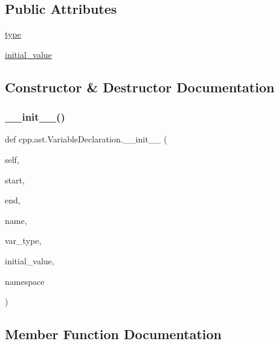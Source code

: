 \subsection*{Public Attributes}
\begin{DoxyCompactItemize}
\item 
\mbox{\hyperlink{classcpp_1_1ast_1_1VariableDeclaration_a8c7cc8578ea12f93c6e1c5c6ef4ddf99}{type}}
\item 
\mbox{\hyperlink{classcpp_1_1ast_1_1VariableDeclaration_a7c259ca42a06e264679e8ab66e7ea374}{initial\+\_\+value}}
\end{DoxyCompactItemize}


\subsection{Constructor \& Destructor Documentation}
\mbox{\label{classcpp_1_1ast_1_1VariableDeclaration_adc19909b6a3b2c2978b02044634fc13f}} 
\subsubsection{\texorpdfstring{\_\_init\_\_()}{\_\_init\_\_()}}
{\footnotesize\ttfamily def cpp.\+ast.\+Variable\+Declaration.\+\_\+\+\_\+init\+\_\+\+\_\+ (\begin{DoxyParamCaption}\item[{}]{self,  }\item[{}]{start,  }\item[{}]{end,  }\item[{}]{name,  }\item[{}]{var\+\_\+type,  }\item[{}]{initial\+\_\+value,  }\item[{}]{namespace }\end{DoxyParamCaption})}



\subsection{Member Function Documentation}
\mbox{\label{classcpp_1_1ast_1_1VariableDeclaration_a9f5c15731d1bdd8fe14c2a575e2f4fe6}} 
